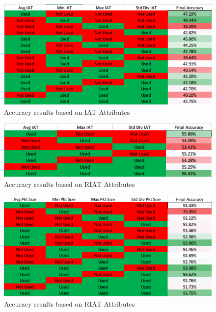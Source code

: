 \documentclass[conference]{IEEEtran}
\begin{document}
\begin{figure}[!t]
	\centering
	\includegraphics[width=7.16in]{avg_iat}
	\caption{Accuracy results based on IAT Attributes}
	\label{fig_iat}
\end{figure}

\begin{figure}[!t]
	\centering
	\includegraphics[width=7.16in]{riat}
	\caption{Accuracy results based on RIAT Attributes}
	\label{fig_riat}
\end{figure}

\begin{figure}[!t]
	\centering
	\includegraphics[width=7.16in]{pkt_size}
	\caption{Accuracy results based on RIAT Attributes}
	\label{fig_pkt_size}
\end{figure}
\end{document}
